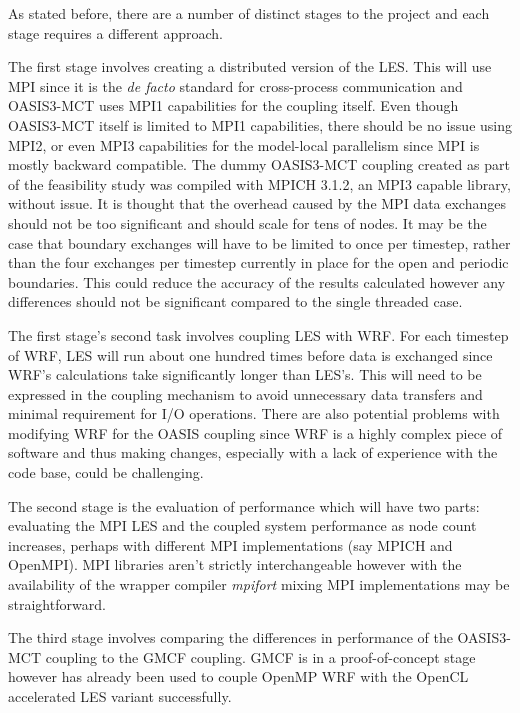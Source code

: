 As stated before, there are a number of distinct stages to the project and each
stage requires a different approach.

The first stage involves creating a distributed version of the LES. This will
use MPI since it is the \textit{de facto} standard for cross-process
communication and OASIS3-MCT uses MPI1 capabilities for the coupling itself.
Even though OASIS3-MCT itself is limited to MPI1 capabilities, there should be
no issue using MPI2, or even MPI3 capabilities for the model-local parallelism
since MPI is mostly backward compatible. The dummy OASIS3-MCT coupling created
as part of the feasibility study was compiled with MPICH 3.1.2, an MPI3 capable
library, without issue. It is thought that the overhead caused by the MPI data
exchanges should not be too significant and should scale for tens of nodes. It
may be the case that boundary exchanges will have to be limited to once per
timestep, rather than the four exchanges per timestep currently in place for the
open and periodic boundaries. This could reduce the accuracy of the results
calculated however any differences should not be significant compared to the
single threaded case.

The first stage's second task involves coupling LES with WRF. For each timestep
of WRF, LES will run about one hundred times before data is exchanged since
WRF's calculations take significantly longer than LES's. This will need to be
expressed in the coupling mechanism to avoid unnecessary data transfers and
minimal requirement for I/O operations. There are also potential problems with
modifying WRF for the OASIS coupling since WRF is a highly complex piece of
software and thus making changes, especially with a lack of experience with the
code base, could be challenging.

The second stage is the evaluation of performance which will have two parts:
evaluating the MPI LES and the coupled system performance as node count
increases, perhaps with different MPI implementations (say MPICH and OpenMPI).
MPI libraries aren't strictly interchangeable however with the availability of
the wrapper compiler \textit{mpifort} mixing MPI implementations may be
straightforward.

The third stage involves comparing the differences in performance of the
OASIS3-MCT coupling to the GMCF coupling. GMCF is in a proof-of-concept stage
however has already been used to couple OpenMP WRF with the OpenCL accelerated
LES variant successfully.

